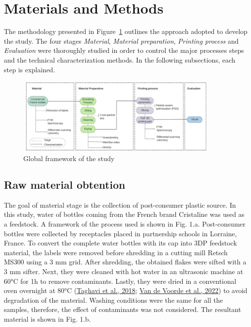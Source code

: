 \documentclass[
  12pt,
  number,
  review]{elsarticle}
\begin{document}
\hypertarget{materials-and-methods}{%
\section{Materials and Methods}\label{materials-and-methods}}

The methodology presented in Figure~\ref{fig-1} outlines the approach
adopted to develop the study. The four stages \emph{Material},
\emph{Material preparation}, \emph{Printing process} and
\emph{Evaluation} were thoroughly studied in order to control the major
processes steps and the technical characterization methods. In the
following subsections, each step is explained.

\begin{figure}

{\centering \includegraphics[width=0.9\textwidth,height=\textheight]{figures/Methodology.png}

}

\caption{\label{fig-1}Global framework of the study}

\end{figure}

\hypertarget{raw-material-obtention}{%
\subsection{Raw material obtention}\label{raw-material-obtention}}

The goal of material stage is the collection of post-consumer plastic
source. In this study, water of bottles coming from the French brand
Cristaline was used as a feedstock. A framework of the process used is
shown in Fig. 1.a. Post-consumer bottles were collected by receptacles
placed in partnership schools in Lorraine, France. To convert the
complete water bottles with its cap into 3DP feedstock material, the
labels were removed before shredding in a cutting mill Retsch MS300
using a 3 mm grid. After shredding, the obtained flakes were sifted with
a 3 mm sifter. Next, they were cleaned with hot water in an ultrasonic
machine at 60°C for 1h to remove contaminants. Lastly, they were dried
in a conventional oven overnight at 80°C
(\protect\hyperlink{ref-taghavi2018}{Taghavi et al., 2018};
\protect\hyperlink{ref-vandevoorde2022}{Van de Voorde et al., 2022}) to
avoid degradation of the material. Washing conditions were the same for
all the samples, therefore, the effect of contaminants was not
considered. The resultant material is shown in Fig. 1.b.
\end{document}
